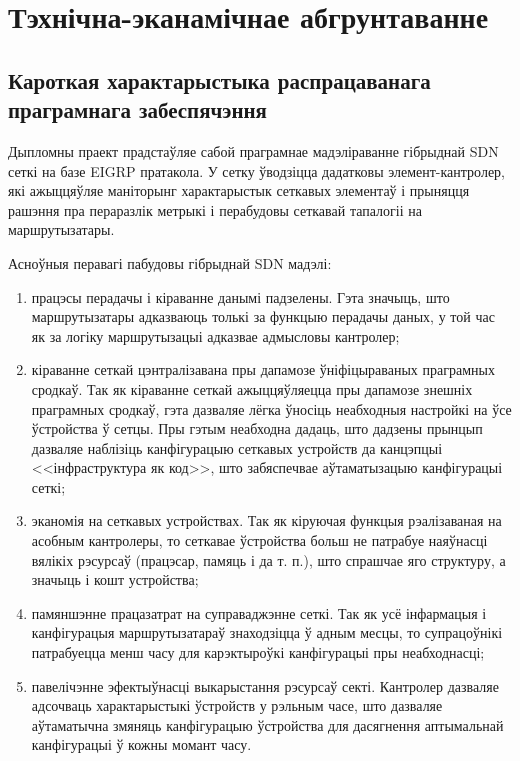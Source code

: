 \section{Тэхнічна-эканамічнае абгрунтаванне}

\subsection{Кароткая характарыстыка распрацаванага праграмнага забеспячэння}

Дыпломны праект прадстаўляе сабой праграмнае мадэліраванне гібрыднай SDN сеткі на базе EIGRP пратакола. У сетку ўводзіцца дадатковы элемент-кантролер, які ажыццяўляе маніторынг характарыстык сеткавых
элементаў і прыняцця рашэння пра пераразлік метрыкі і перабудовы сеткавай тапалогіі на маршрутызатары.

Асноўныя перавагі пабудовы гібрыднай SDN мадэлі:
\begin{enumerate}
    \item працэсы перадачы і кіраванне данымі падзелены. Гэта значыць, што маршрутызатары
        адказваюць толькі за функцыю перадачы даных, у той час як за логіку маршрутызацыі
        адказвае адмысловы кантролер;
    \item кіраванне сеткай цэнтралізавана пры дапамозе ўніфіцыраваных праграмных сродкаў.
        Так як кіраванне сеткай ажыццяўляецца пры дапамозе знешніх праграмных сродкаў, гэта
        дазваляе лёгка ўносіць неабходныя настройкі на ўсе ўстройства ў сетцы.
        Пры гэтым неабходна дадаць, што дадзены прынцып дазваляе наблізіць канфігурацыю
        сеткавых устройств да канцэпцыі <<інфраструктура як код>>, што забяспечвае
        аўтаматызацыю канфігурацыі сеткі;
    \item эканомія на сеткавых устройствах. Так як кіруючая функцыя рэалізаваная на асобным
        кантролеры, то сеткавае ўстройства больш не патрабуе наяўнасці вялікіх рэсурсаў
        (працэсар, памяць і да т. п.), што спрашчае яго структуру, а значыць і кошт устройства;
    \item памяншэнне працазатрат на суправаджэнне сеткі. Так як усё інфармацыя і канфігурацыя
        маршрутызатараў знаходзіцца ў адным месцы, то супрацоўнікі патрабуецца менш часу для
        карэктыроўкі канфігурацыі пры неабходнасці;
    \item павелічэнне эфектыўнасці выкарыстання рэсурсаў секті. Кантролер дазваляе адсочваць
        характарыстыкі ўстройств у рэльным часе, што дазваляе аўтаматычна змяняць канфігурацыю
        ўстройства для дасягнення аптымальнай канфігурацыі ў кожны момант часу.
\end{enumerate}



